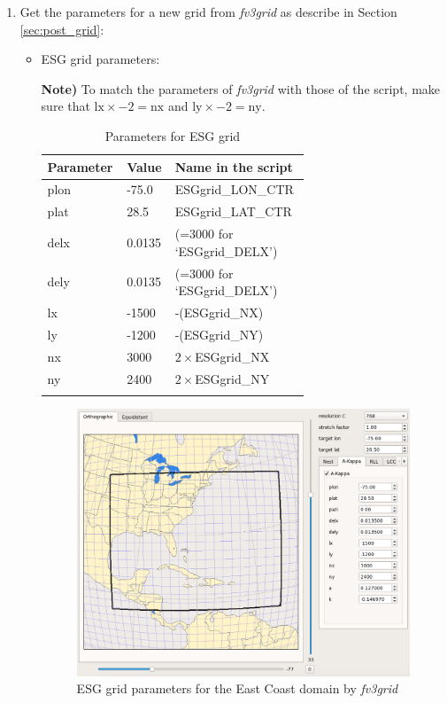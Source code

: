 \documentclass[11pt,fleqn]{report}              %
\begin{document}
\begin{enumerate}
\item Get the parameters for a new grid from {\it fv3grid} as describe in Section \ref{sec:post_grid}: 

\begin{itemize}
\item ESG grid parameters:

{\bf Note)} To match the parameters of {\it fv3grid} with those of the script, make sure that $\text{lx}\times-2=\text{nx}$ and $\text{ly}\times-2=\text{ny}$.

{
\fontsize{10}{12}\selectfont
\begin{longtable}{p{0.15\linewidth} | p{0.1\linewidth} | p{0.4\linewidth}  }
\hline
\hline
 Parameter & Value & Name in the script \\
\hline
 plon & -75.0 & ESGgrid\_LON\_CTR \\
 plat & 28.5 & ESGgrid\_LAT\_CTR \\
 delx & 0.0135 & (=3000 for `ESGgrid\_DELX') \\
 dely & 0.0135 & (=3000 for `ESGgrid\_DELX') \\
 lx & -1500 &  -(ESGgrid\_NX) \\
 ly & -1200 & -(ESGgrid\_NY) \\
 nx & 3000 & $2\times$ESGgrid\_NX \\
 ny & 2400 & $2\times$ESGgrid\_NY \\
\hline
\caption{Parameters for ESG grid}
\label{table:var_ecoast_esg}
\end{longtable}
}

\begin{figure}[ht!]
  \centering
  \includegraphics[width=0.7\linewidth]{ECoast_JCH_esg.png}
  \caption{ESG grid parameters for the East Coast domain by {\it fv3grid} }
  \label{fig:fv3grid_ecoast_esg}
\end{figure}



\end{itemize}
\end{enumerate}
\end{document}

